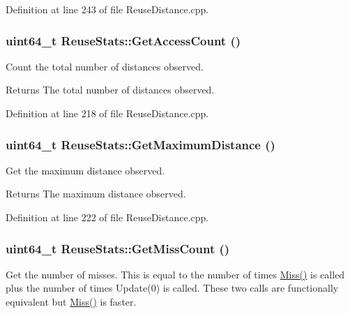 Definition at line 243 of file ReuseDistance.cpp.

\hypertarget{class_reuse_stats_a48935d131ce635b1b37b2a43f0c52217}{
\subsubsection[{GetAccessCount}]{\setlength{\rightskip}{0pt plus 5cm}uint64\_\-t ReuseStats::GetAccessCount ()}}
\label{class_reuse_stats_a48935d131ce635b1b37b2a43f0c52217}
Count the total number of distances observed.

\begin{DoxyReturn}{Returns}
The total number of distances observed. 
\end{DoxyReturn}


Definition at line 218 of file ReuseDistance.cpp.

\hypertarget{class_reuse_stats_ac70175a532ea2dc608e0fd2f04e4fcbb}{
\subsubsection[{GetMaximumDistance}]{\setlength{\rightskip}{0pt plus 5cm}uint64\_\-t ReuseStats::GetMaximumDistance ()}}
\label{class_reuse_stats_ac70175a532ea2dc608e0fd2f04e4fcbb}
Get the maximum distance observed.

\begin{DoxyReturn}{Returns}
The maximum distance observed. 
\end{DoxyReturn}


Definition at line 222 of file ReuseDistance.cpp.

\hypertarget{class_reuse_stats_aeff4f3fe0f2253e1aed432b18ec85d85}{
\subsubsection[{GetMissCount}]{\setlength{\rightskip}{0pt plus 5cm}uint64\_\-t ReuseStats::GetMissCount ()}}
\label{class_reuse_stats_aeff4f3fe0f2253e1aed432b18ec85d85}
Get the number of misses. This is equal to the number of times \hyperlink{class_reuse_stats_a3d963a3b6c2c0b37b23d4e0723a70831}{Miss()} is called plus the number of times Update(0) is called. These two calls are functionally equivalent but \hyperlink{class_reuse_stats_a3d963a3b6c2c0b37b23d4e0723a70831}{Miss()} is faster. 

